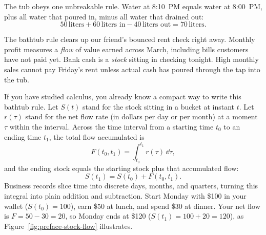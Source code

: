 The tub obeys one unbreakable rule. Water at 8:10~PM equals water at 8:00~PM, plus all water that poured in, minus all water that drained out:
\[
  50\,\text{liters} + 60\,\text{liters in} - 40\,\text{liters out} = 70\,\text{liters}.
\]

\begin{intuitionbox}
The bathtub rule clears up our friend's bounced rent check right away. Monthly profit measures a \emph{flow} of value earned across March, including bills customers have not paid yet. Bank cash is a \emph{stock} sitting in checking tonight. High monthly sales cannot pay Friday's rent unless actual cash has poured through the tap into the tub.
\end{intuitionbox}

If you have studied calculus, you already know a compact way to write this bathtub rule. Let $S(t)$ stand for the stock sitting in a bucket at instant $t$. Let $r(\tau)$ stand for the net flow rate (in dollars per day or per month) at a moment $\tau$ within the interval. Across the time interval from a starting time $t_0$ to an ending time $t_1$, the total flow accumulated is
\[
  F(t_0, t_1) = \int_{t_0}^{t_1} r(\tau)\,\dd\tau,
\]
and the ending stock equals the starting stock plus that accumulated flow:
\[
  S(t_1) = S(t_0) + F(t_0, t_1).
\]
Business records slice time into discrete days, months, and quarters, turning this integral into plain addition and subtraction. Start Monday with \$100 in your wallet ($S(t_0) = 100$), earn \$50 at lunch, and spend \$30 at dinner. Your net flow is $F = 50 - 30 = 20$, so Monday ends at \$120 ($S(t_1) = 100 + 20 = 120$), as Figure~\ref{fig:preface-stock-flow} illustrates.

